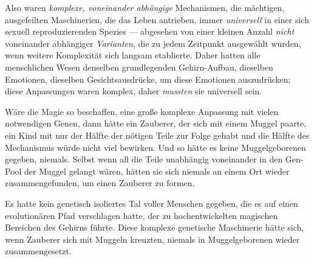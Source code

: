 Also waren \emph{komplexe, voneinander abhängige} Mechanismen, die mächtigen, ausgefeilten Maschinerien, die das Leben antrieben, immer \emph{universell} in einer sich sexuell reproduzierenden Spezies — abgesehen von einer kleinen Anzahl \emph{nicht} voneinander abhängiger \emph{Varianten}, die zu jedem Zeitpunkt ausgewählt wurden, wenn weitere Komplexität sich langsam etablierte. Daher hatten alle menschlichen Wesen denselben grundlegenden Gehirn-Aufbau, dieselben Emotionen, dieselben Gesichtsausdrücke, um diese Emotionen auszudrücken; diese Anpassungen waren komplex, daher \emph{mussten} sie universell sein.

Wäre die Magie so beschaffen, eine große komplexe Anpassung mit vielen notwendigen Genen, dann hätte ein Zauberer, der sich mit einem Muggel paarte, ein Kind mit nur der Hälfte der nötigen Teile zur Folge gehabt und die Hälfte des Mechanismus würde nicht viel bewirken. Und so hätte es keine Muggelgeborenen gegeben, niemals. Selbst wenn all die Teile unabhängig voneinander in den Gen-Pool der Muggel gelangt wären, hätten sie sich niemals an einem Ort wieder zusammengefunden, um einen Zauberer zu formen.

Es hatte kein genetisch isoliertes Tal voller Menschen gegeben, die es auf einen evolutionären Pfad verschlagen hatte, der zu hochentwickelten magischen Bereichen des Gehirns führte. Diese komplexe genetische Maschinerie hätte sich, wenn Zauberer sich mit Muggeln kreuzten, niemals in Muggelgeborenen wieder zusammengesetzt.

